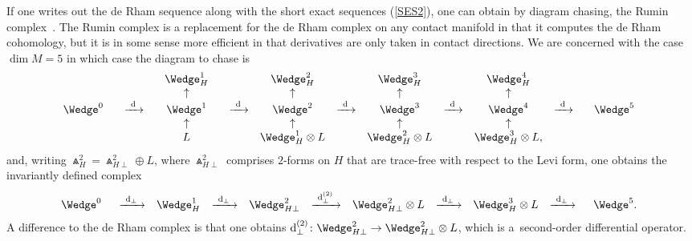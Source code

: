 \documentclass[10pt,a4paper]{amsart}
\numberwithin{equation}{section}
\begin{document}
If one writes out the de Rham sequence along with the short exact
sequences (\ref{SES2}), one can obtain by diagram chasing, the Rumin
complex~\cite{R}. The Rumin complex is a replacement for the de Rham complex
on any contact manifold in that it computes the de Rham cohomology, but it is
in some sense more efficient in that derivatives are only taken in contact
directions. We are concerned with the case $\dim M = 5$ in which case the
diagram to chase is
\[\begin{array}{@{}ccccccccccc}
&&\Wedge_H^1&&\Wedge_H^2&&\Wedge_H^3&&\Wedge_H^4&&\\
&&\uparrow&&\uparrow&&\uparrow&&\uparrow&&\\
\Wedge^0 & \hspace{3mm}\xrightarrow{\ {\rm d}\ }
\hspace{3mm} & \Wedge^1&\hspace{3mm}\xrightarrow{\ {\rm d}\ }&\Wedge^2
&\xrightarrow{\ {\rm d}\ }&\Wedge^3
&\xrightarrow{\ {\rm d}\ }&\Wedge^4
& \xrightarrow{\ {\rm d}\ }& \hspace{3mm}\Wedge^5\\\
&&\uparrow&&\uparrow&&\uparrow&&\uparrow&&\\
&&L&&\Wedge_H^1\otimes L && \Wedge_H^2\otimes L && \Wedge_H^3\otimes L,&&
\end{array}\]
and, writing $\Wedge_H^2=\Wedge_{H\perp}^2\oplus L$, where $\Wedge_{H\perp}^2$
comprises $2$-forms on $H$ that are trace-free with respect to the Levi form,
one obtains the invariantly defined complex
\[\begin{array}{@{}ccccccccccc}
\Wedge^0 & \hspace{2mm} \xrightarrow{\ {\rm d}_\perp \ }
& \Wedge^1_H&\xrightarrow{\ {\rm d}_\perp \ }
&\Wedge^2_{H\perp}&\xrightarrow{\ {\rm d}_\perp^{(2)} \ }
&\Wedge_{H\perp}^2 \otimes L&\xrightarrow{\ {\rm d}_\perp \ }
&\Wedge^3_H \otimes L & \xrightarrow{\ {\rm d}_\perp \ }
& \hspace{2mm} \Wedge^5.
\end{array}\]
A difference to the de Rham complex is that one obtains
${\rm d}_\perp^{(2)}\colon \Wedge_{H\perp}^2 \to \Wedge_{H\perp}^2 \otimes L$,
which is a~second-order differential operator.
\end{document}
